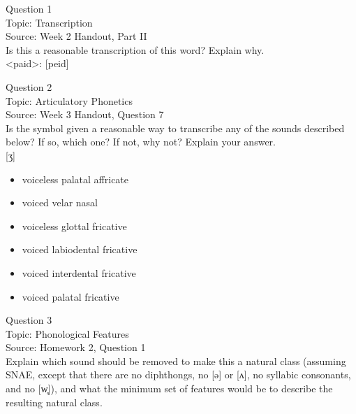 \documentclass[12pt]{article}
\begin{document}
\begin{center}
\textbf{{\color{blue}{\HUGE START OF EXAM\\}}}

\textbf{{\color{blue}{\HUGE Student ID: 29164\\}}}

\textbf{{\color{blue}{\HUGE \\}}}

\end{center}
\newpage

{\large Question 1}\\

Topic: Transcription\\
Source: Week 2 Handout, Part II\\

Is this a reasonable transcription of this word? Explain why.\\

<paid>: {[peid]}


\newpage

{\large Question 2}\\

Topic: Articulatory Phonetics\\
Source: Week 3 Handout, Question 7\\

Is the symbol given a reasonable way to transcribe any of the sounds described below? If so, which one? If not, why not? Explain your answer.\\

{[ʒ]}

\begin{itemize} \item voiceless palatal affricate \item voiced velar nasal \item voiceless glottal fricative \item voiced labiodental fricative \item voiced interdental fricative \item voiced palatal fricative \end{itemize}


\newpage

{\large Question 3}\\

Topic: Phonological Features\\
Source: Homework 2, Question 1\\

Explain which sound should be removed to make this a natural class (assuming SNAE, except that there are no diphthongs, no [ə] or [ʌ], no syllabic consonants, and no [w̥]), and what the minimum set of features would be to describe the resulting natural class.\\
\end{document}
